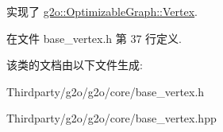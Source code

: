 实现了 \hyperlink{classg2o_1_1OptimizableGraph_1_1Vertex_a61c4e7b7a7a61e1f287069a8cb01004f}{g2o\-::\-Optimizable\-Graph\-::\-Vertex}.



在文件 base\-\_\-vertex.\-h 第 37 行定义.



该类的文档由以下文件生成\-:\begin{DoxyCompactItemize}
\item 
Thirdparty/g2o/g2o/core/base\-\_\-vertex.\-h\item 
Thirdparty/g2o/g2o/core/base\-\_\-vertex.\-hpp\end{DoxyCompactItemize}
